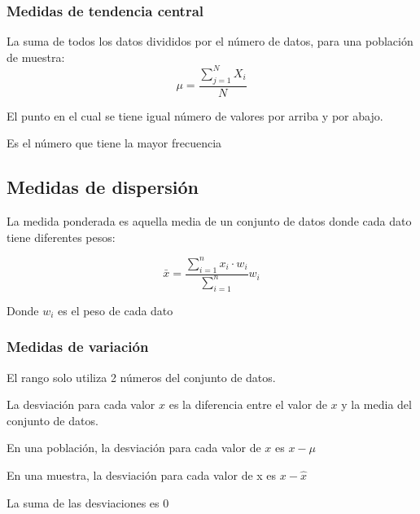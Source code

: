\subsubsection{Medidas de tendencia central}

\begin{definition}[Media]
    La suma de todos los datos divididos por el número de datos, para una población de muestra:
    \begin{equation}
        \mu=\frac{\sum_{j=1}^N X_i}{N}
    \end{equation}
\end{definition}

\begin{definition}[Mediana]
    El punto en el cual se tiene igual número de valores por arriba y por abajo.
\end{definition}

\begin{definition}[Moda]
    Es el número que tiene la mayor frecuencia
\end{definition}

\subsection{Medidas de dispersión}

La medida ponderada es aquella media de un conjunto de datos donde cada dato tiene diferentes pesos:

\begin{equation}
    \bar{x}=\frac{\sum_{i=1}^n x_i\cdot w_i}{\sum_{i=1}^n}w_i
\end{equation}

Donde $w_i$ es el peso de cada dato
\subsubsection{Medidas de variación }

El rango solo utiliza 2 números del conjunto de datos.

\begin{definition}[Desviación]
    La desviación para cada valor $x$ es la diferencia entre el
    valor de $x$ y la media del conjunto de datos.
\end{definition}

En una población, la desviación para cada valor de $x$ es $x-\mu$

En una muestra, la desviación para cada valor de x es $x-\hat{x}$

La suma de las desviaciones es 0

